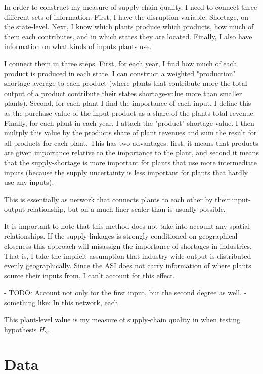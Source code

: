 \documentclass[11pt]{article}
\begin{document}
In order to construct my measure of supply-chain quality, I need to connect three different sets of information. First, I have the disruption-variable, Shortage, on the state-level. Next, I know which plants produce which products, how much of them each contributes, and in which states they are located. Finally, I also have information on what kinds of inputs plants use.

I connect them in three steps. First, for each year, I find how much of each product is produced in each state. I can construct a weighted "production" shortage-average to each product (where plants that contribute more the total output of a product contribute their states shortage-value more than smaller plants). Second, for each plant I find the importance of each input. I define this as the purchase-value of the input-product as a share of the plants total revenue. Finally, for each plant in each year, I attach the "product"-shortage value. I then multply this value by the products share of plant revenues and sum the result for all products for each plant. This has two advantages: first, it means that products are given importance relative to the importance to the plant, and second it means that the supply-shortage is more important for plants that use more intermediate inputs (because the supply uncertainty is less important for plants that hardly use any inputs).


This is essentially as network that connects plants to each other by their input-output relationship, but on a much finer scaler than is usually possible.  

It is important to note that this method does not take into account any spatial relationships. If the supply-linkages is strongly conditioned on geographical closeness this approach will misassign the importance of shortages in industries. That is, I take the implicit assumption that industry-wide output is distributed evenly geographically. Since the ASI does not carry information of where plants source their inputs from, I can't account for this effect.


- TODO: Account not only for the first input, but the second degree as well. - something like: In this network, each


This plant-level value is my measure of supply-chain quality in when testing hypothesis \(H_2\).

\section{Data}%
\label{sub:data}
\end{document}
